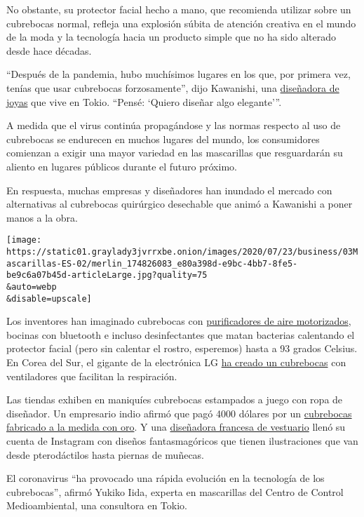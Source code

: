 No obstante, su protector facial hecho a mano, que recomienda utilizar
sobre un cubrebocas normal, refleja una explosión súbita de atención
creativa en el mundo de la moda y la tecnología hacia un producto simple
que no ha sido alterado desde hace décadas.

``Después de la pandemia, hubo muchísimos lugares en los que, por
primera vez, tenías que usar cubrebocas forzosamente'', dijo Kawanishi,
una \href{https://www.instagram.com/sprbyspecialr/?hl=en}{diseñadora de
joyas} que vive en Tokio. ``Pensé: `Quiero diseñar algo elegante'''.

A medida que el virus continúa propagándose y las normas respecto al uso
de cubrebocas se endurecen en muchos lugares del mundo, los consumidores
comienzan a exigir una mayor variedad en las mascarillas que
resguardarán su aliento en lugares públicos durante el futuro próximo.

En respuesta, muchas empresas y diseñadores han inundado el mercado con
alternativas al cubrebocas quirúrgico desechable que animó a Kawanishi a
poner manos a la obra.

\texttt{[image: https://static01.graylady3jvrrxbe.onion/images/2020/07/23/business/03Mascarillas-ES-02/merlin\_174826083\_e80a398d-e9bc-4bb7-8fe5-be9c6a07b45d-articleLarge.jpg?quality=75\\\&auto=webp\\\&disable=upscale]}

Los inventores han imaginado cubrebocas con
\href{https://prtimes.jp/main/html/rd/p/000000559.000032456.html}{purificadores
de aire motorizados}, bocinas con bluetooth e incluso desinfectantes que
matan bacterias calentando el protector facial (pero sin calentar el
rostro, esperemos) hasta a 93 grados Celsius. En Corea del Sur, el
gigante de la electrónica LG
\href{https://asia.nikkei.com/Business/Electronics/LG-debuts-fan-powered-mask-to-ease-breathing}{ha
creado un cubrebocas} con ventiladores que facilitan la respiración.

Las tiendas exhiben en maniquíes cubrebocas estampados a juego con ropa
de diseñador. Un empresario indio afirmó que pagó 4000 dólares por un
\href{https://www.scmp.com/news/asia/south-asia/article/3091866/coronavirus-bling-bling-indian-businessman-wears-us4000-custom}{cubrebocas
fabricado a la medida con oro}. Y una
\href{https://www.instagram.com/sophiecochevelou/}{diseñadora francesa
de vestuario} llenó su cuenta de Instagram con diseños fantasmagóricos
que tienen ilustraciones que van desde pterodáctilos hasta piernas de
muñecas.

El coronavirus ``ha provocado una rápida evolución en la tecnología de
los cubrebocas'', afirmó Yukiko Iida, experta en mascarillas del Centro
de Control Medioambiental, una consultora en Tokio.

